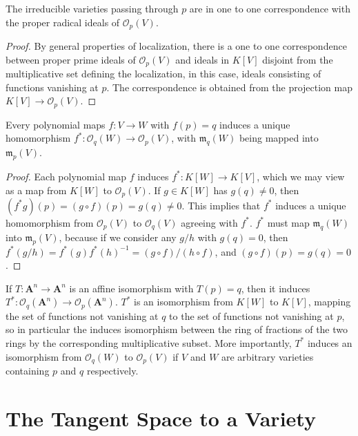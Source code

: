 \begin{prop}
    The irreducible varieties passing through $p$ are in one to one correspondence with the proper radical ideals of $\mathcal{O}_p(V)$.
\end{prop}
\begin{proof}
    By general properties of localization, there is a one to one correspondence between proper prime ideals of $\mathcal{O}_p(V)$ and ideals in $K[V]$ disjoint from the multiplicative set defining the localization, in this case, ideals consisting of functions vanishing at $p$. The correspondence is obtained from the projection map $K[V] \to \mathcal{O}_p(V)$.
\end{proof}

\begin{prop}
    Every polynomial maps $f: V \to W$ with $f(p) = q$ induces a unique homomorphism $f^*: \mathcal{O}_q(W) \to \mathcal{O}_p(V)$, with $\mathfrak{m}_q(W)$ being mapped into $\mathfrak{m}_p(V)$.
\end{prop}
\begin{proof}
    Each polynomial map $f$ induces $f^*: K[W] \to K[V]$, which we may view as a map from $K[W]$ to $\mathcal{O}_p(V)$. If $g \in K[W]$ has $g(q) \neq 0$, then $(f^* g)(p) = (g \circ f)(p) = g(q) \neq 0$. This implies that $f^*$ induces a unique homomorphism from $\mathcal{O}_p(V)$ to $\mathcal{O}_q(V)$ agreeing with $f^*$. $f^*$ must map $\mathfrak{m}_q(W)$ into $\mathfrak{m}_p(V)$, because if we consider any $g/h$ with $g(q) = 0$, then $f^*(g/h) = f^*(g)f^*(h)^{-1} = (g \circ f)/(h \circ f)$, and $(g \circ f)(p) = g(q) = 0$.
\end{proof}

If $T: \mathbf{A}^n \to \mathbf{A}^n$ is an affine isomorphism with $T(p) = q$, then it induces $T^*: \mathcal{O}_q(\mathbf{A}^n) \to \mathcal{O}_p(\mathbf{A}^n)$. $T^*$ is an isomorphism from $K[W]$ to $K[V]$, mapping the set of functions not vanishing at $q$ to the set of functions not vanishing at $p$, so in particular the induces isomorphism between the ring of fractions of the two rings by the corresponding multiplicative subset. More importantly, $T^*$ induces an isomorphism from $\mathcal{O}_q(W)$ to $\mathcal{O}_p(V)$ if $V$ and $W$ are arbitrary varieties containing $p$ and $q$ respectively.

\section{The Tangent Space to a Variety}

